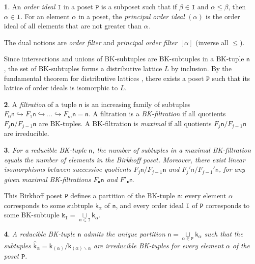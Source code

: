 \documentclass[11pt]{article}
\theoremstyle{plain}
\newtheorem{thm}{\protect\theoremname}[section]
\theoremstyle{definition}
\newtheorem{defn}[thm]{\protect\definitionname}
\theoremstyle{remark}
\theoremstyle{plain}
\theoremstyle{plain}
\newtheorem{prop}[thm]{\protect\propositionname}
\theoremstyle{plain}
\theoremstyle{definition}
\providecommand{\definitionname}{Definition}
\providecommand{\propositionname}{Proposition}
\providecommand{\theoremname}{Theorem}
\begin{document}
\begin{defn}
An \textit{order ideal} $\mathtt{I}$ in a poset $\mathtt{P}$ is
a subposet such that if $\beta\in\mathtt{I}$ and $\alpha\leq\beta$,
then $\alpha\in\mathtt{I}$. For an element $\alpha$ in a poset,
the \textit{principal order ideal }$(\alpha)$ is the order ideal
of all elements that are not greater than $\alpha.$

The dual notions are \textit{order filter} and \textit{principal order
filter} $[\alpha]$ (inverse all $\leq$).
\end{defn}

Since intersections and unions of BK-subtuples are BK-subtuples in
a BK-tuple $\mathsf{n}$ \cite{pokidkin_combinatorics_2025}, the
set of BK-subtuples forms a distributive lattice $L$ by inclusion.
By the fundamental theorem for distributive lattices \cite{stanley_enumerative_2011},
there exists a poset $\mathtt{P}$ such that its lattice of order
ideals is isomorphic to $L$.
\begin{defn}
A \textit{filtration} of a tuple $\mathsf{n}$ is an increasing family
of subtuples $F_{0}\mathsf{n}\hookrightarrow F_{1}\mathsf{n}\hookrightarrow...\hookrightarrow F_{m}\mathsf{n}=\mathsf{n}.$
A filtration is a \textit{BK-filtration} if all quotients $F_{j}\mathsf{n}/F_{j-1}\mathsf{n}$
are BK-tuples. A BK-filtration is \textit{maximal} if all quotients
$F_{j}\mathsf{n}/F_{j-1}\mathsf{n}$ are irreducible.
\end{defn}

\begin{prop}
\label{Corollary. Filtration of BK-tuple with MV>0}For a reducible
BK-tuple $\mathsf{n}$, the number of subtuples in a maximal BK-filtration
equals the number of elements in the Birkhoff poset. Moreover, there
exist linear isomorphisms between successive quotients $F_{j}\mathsf{n}/F_{j-1}\mathsf{n}$
and $F_{j}'\mathsf{n}/F_{j-1}'\mathsf{n}$, for any given maximal
BK-filtrations $F_{\bullet}\mathsf{n}$ and $F'_{\bullet}\mathsf{n}.$
\end{prop}

This Birkhoff poset $\mathtt{P}$ defines a partition of the BK-tuple
$\mathsf{n}$: every element $\alpha$ corresponds to some subtuple
$\mathsf{k}_{\alpha}$ of $\mathsf{n}$, and every order ideal $\mathtt{I}$
of $\mathtt{P}$ corresponds to some BK-subtuple $\mathtt{k_{I}}=\underset{\alpha\in\mathtt{I}}{\sqcup}\mathsf{k}_{\alpha}.$ 
\begin{thm}
\textup{\label{Theorem. Poset partition of a reducible BK-tuple }
\cite{pokidkin_combinatorics_2025}} A reducible BK-tuple $\mathsf{n}$
admits the unique partition $\mathsf{n}=\underset{\alpha\in\mathtt{P}}{\sqcup}\mathsf{k}_{\alpha}$
such that the subtuples $\hat{\mathsf{k}}_{\alpha}=\mathsf{k}_{(\alpha)}/\mathsf{k}_{(\alpha)\backslash\alpha}$
are irreducible BK-tuples for every element $\alpha$ of the poset
$\mathtt{P}$.
\end{thm}
\end{document}
